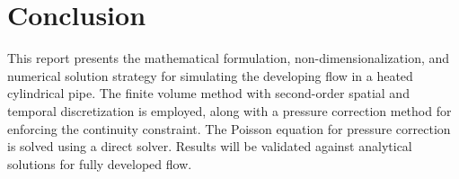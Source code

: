 \documentclass[12pt,a4paper]{article}
\begin{document}
\section{Conclusion}

This report presents the mathematical formulation, non-dimensionalization, and numerical solution strategy for simulating the developing flow in a heated cylindrical pipe. The finite volume method with second-order spatial and temporal discretization is employed, along with a pressure correction method for enforcing the continuity constraint. The Poisson equation for pressure correction is solved using a direct solver. Results will be validated against analytical solutions for fully developed flow.

\newpage

\appendix








\end{document}

